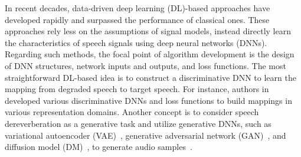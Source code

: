In recent decades, data-driven deep learning (DL)-based approaches have developed rapidly and surpassed the performance of classical ones.
These approaches rely less on the assumptions of signal models, instead directly learn the characteristics of speech signals using deep neural networks (DNNs).
Regarding such methods, the focal point of algorithm development is the design of DNN structures, network inputs and outputs, and loss functions.
The most straightforward DL-based idea is to construct a discriminative DNN to learn the mapping from degraded speech to target speech.
For instance, authors in \cite{han2015learning,luo2018real,zhao2020monaural,hao2021fullsubnet,zhou2023speech,xiong2022spectro} developed various discriminative DNNs and loss functions to build mappings in various representation domains.
Another concept is to consider speech dereverberation as a generative task and utilize generative DNNs, such as variational autoencoder (VAE)~\cite{Kingma2014auto}, generative adversarial network (GAN)~\cite{goodfellow2020generative}, and diffusion model (DM)~\cite{ho2020denoising}, to generate audio samples~\cite{fu2019metricgan,abdulatif2024cmgan,richter2023speech,lemercier2023storm}.
